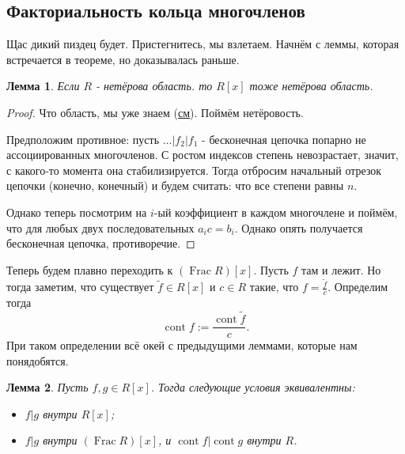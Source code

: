 \documentclass[a4paper,100pt]{article}
\theoremstyle{indented}
\newtheorem{lemma}{Лемма}
\theoremstyle{definition}
\theoremstyle{remark}
\DeclareMathOperator{\Frac}{Frac}
\DeclareMathOperator{\cont}{cont}
\begin{document}
\resetall

\subsection{Факториальность кольца многочленов}

Щас дикий пиздец будет. Пристегнитесь, мы взлетаем. Начнём с леммы, которая встречается в теореме, но доказывалась раньше.\\

\begin{lemma}
    Если $R$ - нетёрова область. то $R[x]$ тоже нетёрова область.
\end{lemma}

\begin{proof}
    Что область, мы уже знаем (\hyperlink{t3}{см}). Поймём нетёровость.\ 

    Предположим противное: пусть $\dots \vert f_2\vert f_1$ - бесконечная цепочка попарно не ассоциированных многочленов. С ростом индексов степень невозрастает, значит, с какого-то момента она стабилизируется. Тогда отбросим начальный отрезок цепочки (конечно, конечный) и будем считать: что все степени равны $n$.\ 

    Однако теперь посмотрим на $i$-ый коэффициент в каждом многочлене и поймём, что для любых двух последовательных $a_i c=b_i$. Однако опять получается бесконечная цепочка, противоречие.
\end{proof}

Теперь будем плавно переходить к $(\Frac R)[x]$. Пусть $f$ там и лежит. Но тогда заметим, что существует $\tilde{f}\in R[x]$ и $c\in R$ такие, что $f=\frac{\tilde{f}}{c}$. Определим тогда 
\[
    \cont f:=\frac{\cont \tilde{f}}{c}.
\]
При таком определении всё окей с предыдущими леммами, которые нам понядобятся.\\

\begin{lemma}
    Пусть $f, g\in R[x]$. Тогда следующие условия эквивалентны:\
    
    \begin{itemize}
        \item $f\vert g$ внутри $R[x]$;
        \item $f\vert g$ внутри $(\Frac R)[x]$, и $\cont f\vert \cont g$ внутри $R$.
    \end{itemize}
\end{lemma}
\end{document}
